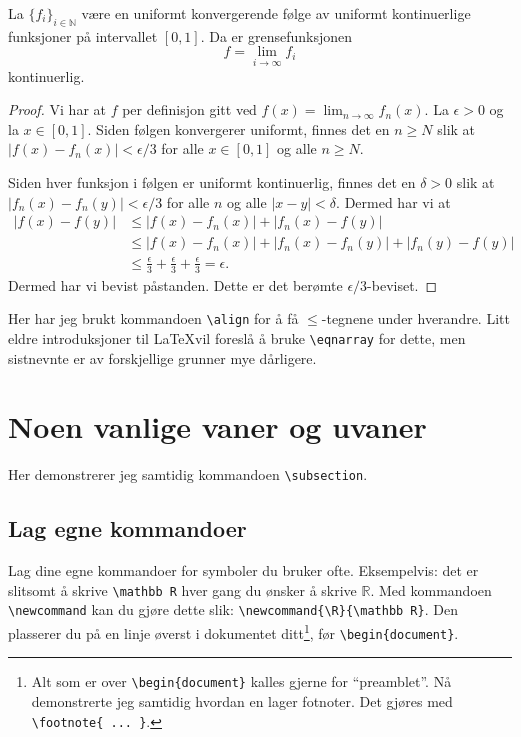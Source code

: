 \documentclass[a4paper, norsk]{article}  %
\newcommand{\R}{\mathbb{R}}
\newcommand{\N}{\mathbb{N}}
\begin{document}
\begin{thm}
La $\{ f_i \}_{i \in \N}$ være en uniformt konvergerende følge av uniformt kontinuerlige funksjoner på intervallet $[0,1]$. Da er grensefunksjonen
\[
\label{limitfunction}
f = \lim_{i \to \infty} f_i
\]
kontinuerlig. 
\end{thm}
\begin{proof}
Vi har at $f$ per definisjon gitt ved $f(x) = \lim_{n \to \infty} f_n(x)$.  La $\epsilon > 0$ og la $x \in [0,1]$. Siden følgen konvergerer uniformt, finnes det en $n \ge N$ slik at $\lvert f(x)-f_n(x) \rvert < \epsilon/3$ for alle $x \in [0,1]$ og alle $n \ge N$.

Siden hver funksjon i følgen er uniformt kontinuerlig, finnes det en $\delta > 0$ slik at $\lvert f_n(x)-f_n(y) \rvert < \epsilon/3$ for alle $n$ og alle $\lvert x - y \rvert < \delta$. Dermed har vi at
\begin{align*}
  \lvert f(x) - f(y) \rvert &\le \lvert f(x) - f_n(x) \rvert + \lvert f_n(x) - f(y) \rvert \\
&\le \lvert f(x) - f_n(x) \rvert + \lvert f_n(x) - f_n(y) \rvert + \lvert f_n(y) - f(y) \rvert\\ 
&\le \frac \epsilon 3 + \frac \epsilon 3 + \frac \epsilon 3 = \epsilon.
\end{align*}
Dermed har vi bevist påstanden. Dette er det berømte $\epsilon/3$-beviset.
\end{proof}

Her har jeg brukt kommandoen \texttt{\textbackslash align} for å få $\le$-tegnene under hver\-andre. Litt eldre introduksjoner til \LaTeX vil foreslå å bruke \texttt{\textbackslash eqnarray} for dette, men sistnevnte er av forskjellige grunner mye dårligere. 

\section{Noen vanlige vaner og uvaner}
\label{seksjonvaner}

Her demonstrerer jeg samtidig kommandoen \verb|\subsection|.

\subsection{Lag egne kommandoer}

Lag dine egne kommandoer for symboler du bruker ofte. Eksempelvis: det er slitsomt å skrive \verb|\mathbb R| hver gang du ønsker å skrive $\mathbb R$. Med kommandoen \verb|\newcommand| kan du gjøre dette slik: \verb|\newcommand{\R}{\mathbb R}|. Den plasserer du på en linje øverst i dokumentet ditt\footnote{Alt som er over \texttt{\textbackslash begin\{document\}} kalles gjerne for ``preamblet''. Nå demonstrerte jeg samtidig hvordan en lager fotnoter. Det gjøres med \texttt{\textbackslash footnote\{ ... \}}.}, før \verb|\begin{document}|.
\end{document}
